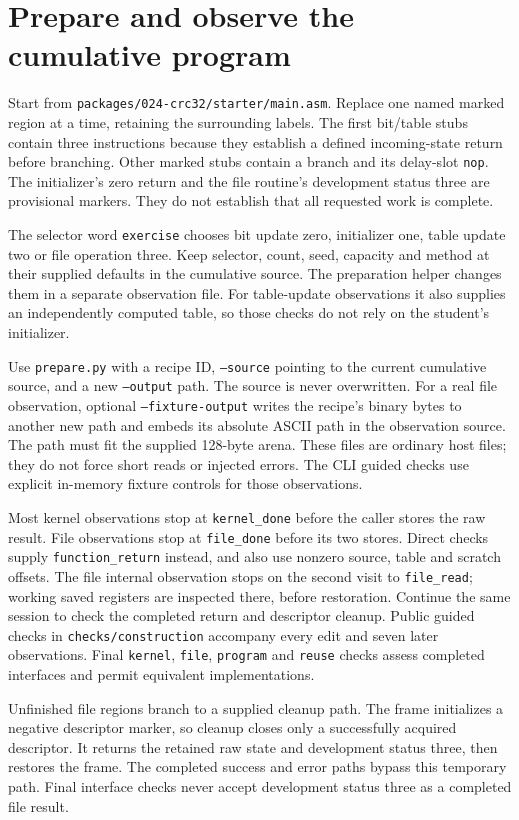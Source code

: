 \section{Prepare and observe the cumulative program}
Start from \texttt{packages/024-crc32/starter/main.asm}. Replace one named marked region
at a time, retaining the surrounding labels. The first bit/table stubs contain three
instructions because they establish a defined incoming-state return before branching.
Other marked stubs contain a branch and its delay-slot \texttt{nop}. The initializer's
zero return and the file routine's development status three are provisional markers.
They do not establish that all requested work is complete.

The selector word \texttt{exercise} chooses bit update zero, initializer one, table
update two or file operation three. Keep selector, count, seed, capacity and method at
their supplied defaults in the cumulative source. The preparation helper changes them
in a separate observation file. For table-update observations it also supplies an
independently computed table, so those checks do not rely on the student's initializer.

Use \texttt{prepare.py} with a recipe ID, \texttt{--source} pointing to the current
cumulative source, and a new \texttt{--output} path. The source is never overwritten.
For a real file observation, optional \texttt{--fixture-output} writes the recipe's
binary bytes to another new path and embeds its absolute ASCII path in the observation
source. The path must fit the supplied 128-byte arena. These files are ordinary host
files; they do not force short reads or injected errors. The CLI guided checks use
explicit in-memory fixture controls for those observations.

Most kernel observations stop at \texttt{kernel\_done} before the caller stores the
raw result. File observations stop at \texttt{file\_done} before its two stores. Direct
checks supply \texttt{function\_return} instead, and also use nonzero source, table
and scratch offsets. The file internal observation stops on the second visit to
\texttt{file\_read}; working saved registers are inspected there, before restoration.
Continue the same session to check the completed return and descriptor cleanup.
Public guided checks in \texttt{checks/construction} accompany every edit and seven
later observations. Final \texttt{kernel}, \texttt{file}, \texttt{program} and
\texttt{reuse} checks assess completed interfaces and permit equivalent implementations.

Unfinished file regions branch to a supplied cleanup path. The frame initializes a
negative descriptor marker, so cleanup closes only a successfully acquired descriptor.
It returns the retained raw state and development status three, then restores the
frame. The completed success and error paths bypass this temporary path. Final
interface checks never accept development status three as a completed file result.
